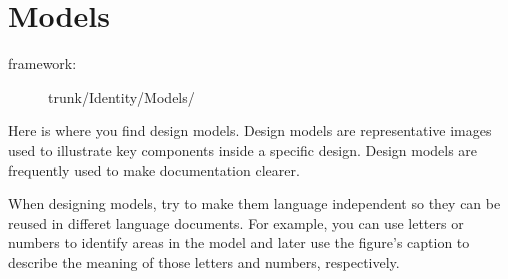 
\section{Models}
\hypertarget{sec:Concepts:Identity:Models}{}
\label{sec:Concepts:Identity:Models}

\begin{description}
\item[framework:] trunk/Identity/Models/
\end{description}

\noindent Here is where you find design models. Design models are
representative images used to illustrate key components inside a
specific design. Design models are frequently used to make
documentation clearer. 

When designing models, try to make them language independent so they
can be reused in differet language documents. For example, you can use
letters or numbers to identify areas in the model and later use the
figure's caption to describe the meaning of those letters and numbers,
respectively.  
